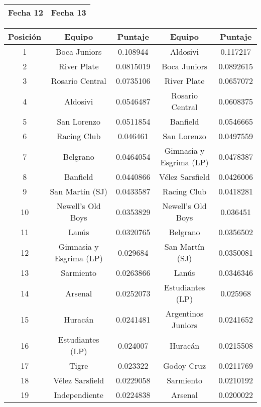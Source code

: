 \begin{table}
	\center
	\begin{flushright}
	\begin{tabular}{| m{16.65em} || m{17.15em} |}
		\hline Fecha 12 & Fecha 13 \\ \hline
	\end{tabular}

	\begin{tabular}{| c | c | c || c | c |}
	  	\hline
	  	Posición & Equipo & Puntaje & Equipo & Puntaje \\ \hline \hline
		1 & Boca Juniors & 0.108944 &  Aldosivi & 0.117217 \\ \hline
		2 & River Plate & 0.0815019 & Boca Juniors & 0.0892615 \\ \hline
		3 & Rosario Central & 0.0735106 & River Plate & 0.0657072 \\ \hline
		4 & Aldosivi & 0.0546487 & Rosario Central & 0.0608375 \\ \hline
		5 & San Lorenzo & 0.0511854 & Banfield & 0.0546665 \\ \hline
		6 & Racing Club & 0.046461 & San Lorenzo & 0.0497559 \\ \hline
		7 & Belgrano & 0.0464054 & Gimnasia y Esgrima (LP) & 0.0478387 \\ \hline
		8 & Banfield & 0.0440866 & Vélez Sarsfield & 0.0426006 \\ \hline
		9 & San Martín (SJ) & 0.0433587 & Racing Club & 0.0418281\\ \hline
		10 & Newell's Old Boys & 0.0353829 & Newell's Old Boys & 0.036451 \\ \hline
		11 & Lanús & 0.0320765 & Belgrano & 0.0356502 \\ \hline
		12 & Gimnasia y Esgrima (LP) & 0.029684 & San Martín (SJ) & 0.0350081 \\ \hline
		13 & Sarmiento & 0.0263866 & Lanús & 0.0346346 \\ \hline
		14 & Arsenal & 0.0252073 & Estudiantes (LP) & 0.025968 \\ \hline
		15 & Huracán & 0.0241481 & Argentinos Juniors & 0.0241652 \\ \hline
		16 & Estudiantes (LP) & 0.024007 & Huracán & 0.0215508 \\ \hline
		17 & Tigre & 0.023322 & Godoy Cruz & 0.0211769 \\ \hline
		18 & Vélez Sarsfield & 0.0229058 & Sarmiento & 0.0210192 \\ \hline
		19 & Independiente & 0.0224838 & Arsenal & 0.0200022 \\ \hline

\end{tabular}
\end{flushright}
\end{table}
